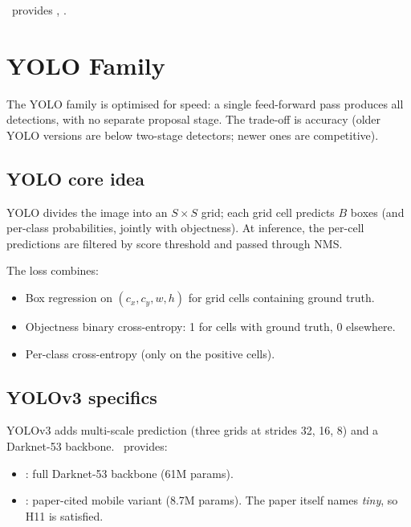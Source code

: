 \Lucid\ provides ,
.

\section{YOLO Family}
\label{sec:detection_segmentation:yolo}

The YOLO family \cite{redmon_yolo_2016, redmon_yolov3_2018} is
optimised for speed: a single feed-forward pass produces all
detections, with no separate proposal stage. The trade-off is
accuracy (older YOLO versions are below two-stage detectors;
newer ones are competitive).

\subsection{YOLO core idea}
\label{ssec:detection_segmentation:yolo_core}

YOLO divides the image into an $S \times S$ grid; each grid
cell predicts $B$ boxes (and per-class probabilities, jointly
with objectness). At inference, the per-cell predictions are
filtered by score threshold and passed through NMS.

The loss combines:
\begin{itemize}
  \item Box regression on $(c_x, c_y, w, h)$ for grid cells
    containing ground truth.
  \item Objectness binary cross-entropy: 1 for cells with
    ground truth, 0 elsewhere.
  \item Per-class cross-entropy (only on the positive cells).
\end{itemize}

\subsection{YOLOv3 specifics}
\label{ssec:detection_segmentation:yolov3}

YOLOv3 \cite{redmon_yolov3_2018} adds multi-scale prediction
(three grids at strides 32, 16, 8) and a Darknet-53 backbone.
\Lucid\ provides:

\begin{itemize}
  \item {}: full Darknet-53 backbone (61M params).
  \item {}: paper-cited mobile variant
    (8.7M params). The paper itself names \emph{tiny}, so H11 is
    satisfied.
\end{itemize}

